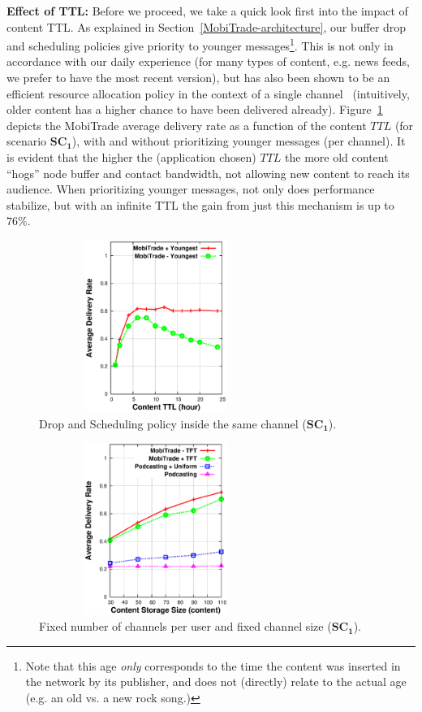 \noindent \textbf{Effect of TTL:} Before we proceed, we take a quick look first into the impact of content TTL. As explained in Section~\ref{MobiTrade-architecture}, our buffer drop and scheduling policies give priority to younger messages\footnote{Note that this age \emph{only} corresponds to the time the content was inserted in the network by its publisher, and does not (directly) relate to the actual age (e.g. an old vs. a new rock song.)}. This is not only in accordance with our daily experience (for many types of content, e.g. news feeds, we prefer to have the most recent version), but has also been shown to be an efficient resource allocation policy in the context of a single channel~\cite{TMC:Report} (intuitively, older content has a higher chance to have been delivered already). Figure~\ref{DO} depicts the MobiTrade average delivery rate as a function of the content $TTL$ (for scenario $\mathbf{SC_1}$), with and without prioritizing younger messages (per channel). It is evident that the higher the (application chosen) $TTL$ the more old content ``hogs'' node buffer and contact bandwidth, not allowing new content to reach its audience. When prioritizing younger messages, not only does performance stabilize, but with an infinite TTL the gain from just this mechanism is up to $76\%$.

\begin{figure}[!h]
  \begin{center}
    \includegraphics[width=3in,height=2.2in]{Chapitre5/fig3.eps}
  \end{center}
  \caption{Drop and Scheduling policy inside the same channel ($\mathbf{SC_1}$).}
  \label{DO}
\end{figure}

\begin{figure}[!h]
  \begin{center}
    \includegraphics[width=3in,height=2.2in]{Chapitre5/fig5.eps}
  \end{center}
  \caption{Fixed number of channels per user and fixed channel size ($\mathbf{SC_1}$).}
  \label{CS+FNC+FCS}
\end{figure}

